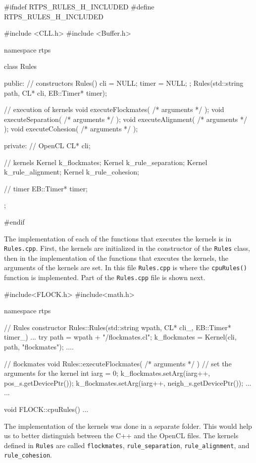 \begin{cppcode}{0}
#ifndef RTPS_RULES_H_INCLUDED
#define RTPS_RULES_H_INCLUDED

#include <CLL.h>
 #include <Buffer.h>

namespace rtps
 {
	class Rules
	{
		public:
			// constructors
			Rules() { cli = NULL; timer = NULL; };
			Rules(std::string path, CL* cli, EB::Timer* timer);
			
			// execution of kernels
			void executeFlockmates( /* arguments */ );
			void executeSeparation( /* arguments */ );
			void executeAlignment( /* arguments */ );
			void executeCohesion( /* arguments */ );
			
		private:
			// OpenCL
			CL* cli;
			
			// kernels
			Kernel k_flockmates;
			Kernel k_rule_separation;
			Kernel k_rule_alignment;
			Kernel k_rule_cohesion;
			
			// timer
			EB::Timer* timer;
	};
}
#endif
\end{cppcode}

The implementation of each of the functions that executes the kernels is in \texttt{Rules.cpp}. First, the kernels are initialized in the constructor of the \texttt{Rules} class, then in the implementation of the functions that executes the kernels, the arguments of the kernels are set. In this file \texttt{Rules.cpp} is where the \texttt{cpuRules()} function is implemented. Part of the \texttt{Rules.cpp} file is shown next.

\begin{cppcode}{0}
#include<FLOCK.h>
#include<math.h>

namespace rtps
{
	// Rules constructor
	Rules::Rules(std::string wpath, CL* cli_, EB::Timer* timer_)
	{
		...
		try
		{
			path = wpath + "/flockmates.cl";
			k_flockmates = Kernel(cli, path, "flockmates");
		}
		....
	}

	// flockmates
	void Rules::executeFlockmates( /* arguments */ )
	{
		// set the arguments for the kernel
		int iarg = 0;
		k_flockmates.setArg(iarg++, pos_s.getDevicePtr());
		k_flockmates.setArg(iarg++, neigh_s.getDevicePtr());
		...
	}
	...
	
	void FLOCK::cpuRules()
	{
		...
	}
}
\end{cppcode}

The implementation of the kernels was done in a separate folder. This would help us to better distinguish between the C++ and the OpenCL files. The kernels defined in \texttt{Rules} are called \texttt{flockmates}, \texttt{rule\_separation}, \texttt{rule\_alignment}, and \texttt{rule\_cohesion}. %


